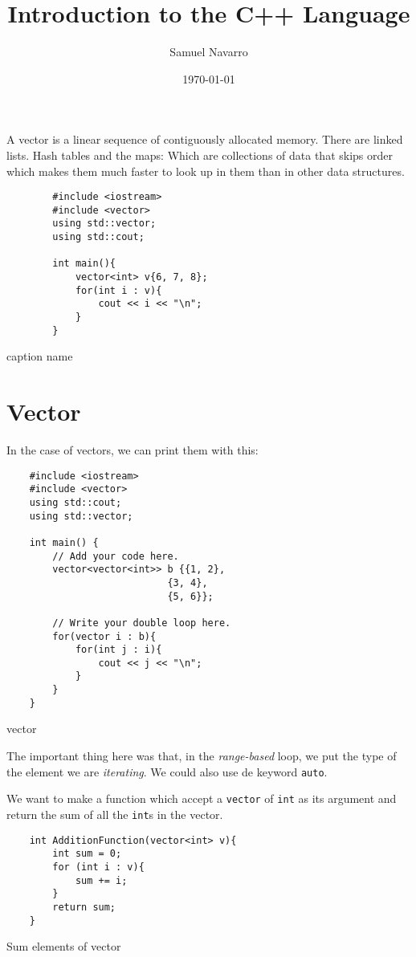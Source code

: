 \documentclass[11pt, a4paper]{article}
\begin{document}
\title{Introduction to the C++ Language}
\author{Samuel Navarro}
\date{\today}
\maketitle
	A vector is a linear sequence of contiguously allocated memory. 
	There are linked lists. 
	Hash tables and the maps: Which are collections of data that skips order which makes them much faster to look up in them than in other data structures.


	\begin{listing}
	\begin{verbatim}
		#include <iostream>
		#include <vector>
		using std::vector;
		using std::cout;

		int main(){
			vector<int> v{6, 7, 8};
			for(int i : v){
				cout << i << "\n";
			}
		}
	\end{verbatim}
	\caption{caption name}
	\label{lst:caption_name}
	\end{listing}


	\section{Vector}%
	\label{sec:vector}
	
	In the case of vectors, we can print them with this:

	\begin{listing}
	\begin{verbatim}
	#include <iostream>
	#include <vector>
	using std::cout;
	using std::vector;

	int main() {
		// Add your code here.
		vector<vector<int>> b {{1, 2},
							{3, 4},
							{5, 6}};

		// Write your double loop here.
		for(vector i : b){
			for(int j : i){
				cout << j << "\n";
			}
		}
	}
	\end{verbatim}
	\caption{vector}
	\label{lst:vector}
	\end{listing}
	The important thing here was that, in the \textit{range-based} loop, we put the type of the element we are \textit{iterating}. We could also use de keyword \texttt{auto}.
	


	We want to make a function which accept a \texttt{vector} of \texttt{int} as its argument and return the sum of all the \texttt{int}s in the vector. 

	\begin{listing}
	\begin{verbatim}
	int AdditionFunction(vector<int> v){
		int sum = 0;
		for (int i : v){
			sum += i;
		}
		return sum;
	}
	\end{verbatim}
	\caption{Sum elements of vector}
	\label{lst:sum_elements_of_vector}
	\end{listing}
\end{document}
